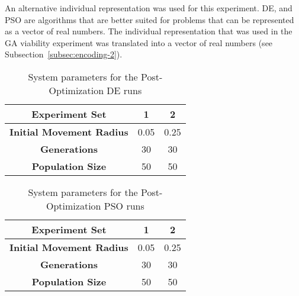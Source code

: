 An alternative individual representation was used for this experiment. DE, and PSO are algorithms that are better suited for problems that can be represented as a vector of real numbers. The individual representation that was used in the GA viability experiment was translated into a vector of real numbers (see Subsection~\ref{subsec:encoding-2}).

\begin{table}
	\centering
	\begin{tabular}{ | >{\bfseries}c | c | c | }
		\hline
		Experiment Set & 1 & 2 \\ \hline
		Initial Movement Radius & 0.05 & 0.25 \\ \hline
		Generations & 30 & 30 \\ \hline
		Population Size & 50 & 50 \\ \hline
	\end{tabular}
	\caption{System parameters for the Post-Optimization DE runs}
	\label{table:post-op-de}
\end{table}

\begin{table}
	\centering
	\begin{tabular}{ | >{\bfseries}c | c | c | }
		\hline
		Experiment Set & 1 & 2 \\ \hline
		Initial Movement Radius & 0.05 & 0.25 \\ \hline
		Generations & 30 & 30 \\ \hline
		Population Size & 50 & 50 \\ \hline
	\end{tabular}
	\caption{System parameters for the Post-Optimization PSO runs}
	\label{table:post-op-pso}
\end{table}
